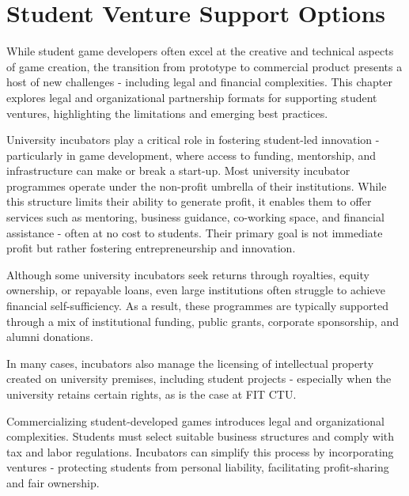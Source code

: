 \chapter{Student Venture Support Options}

\begin{chapterabstract}
    While student game developers often excel at the creative and technical aspects of game creation, the transition from prototype to commercial product presents a host of new challenges - including legal and financial complexities. This chapter explores legal and organizational partnership formats for supporting student ventures, highlighting the limitations and emerging best practices.
\end{chapterabstract}

University incubators play a critical role in fostering student-led innovation - particularly in game development, where access to funding, mentorship, and infrastructure can make or break a start-up. Most university incubator programmes operate under the non-profit umbrella of their institutions. While this structure limits their ability to generate profit, it enables them to offer services such as mentoring, business guidance, co-working space, and financial assistance - often at no cost to students. Their primary goal is not immediate profit but rather fostering entrepreneurship and innovation.

Although some university incubators seek returns through royalties, equity ownership, or repayable loans, even large institutions often struggle to achieve financial self-sufficiency. As a result, these programmes are typically supported through a mix of institutional funding, public grants, corporate sponsorship, and alumni donations.

In many cases, incubators also manage the licensing of intellectual property created on university premises, including student projects - especially when the university retains certain rights, as is the case at FIT CTU. 

Commercializing student-developed games introduces legal and organizational complexities. Students must select suitable business structures and comply with tax and labor regulations. Incubators can simplify this process by incorporating ventures - protecting students from personal liability, facilitating profit-sharing and fair ownership.

